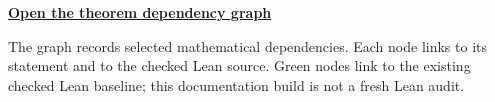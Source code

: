 \documentclass[11pt]{article}
\begin{document}
\maketitle
\noindent\href{dependency-graph.svg}{\textbf{Open the theorem dependency graph}}\par
The graph records selected mathematical dependencies. Each node links to its
statement and to the checked Lean source. Green nodes link to the existing checked Lean baseline; this documentation build is not a fresh Lean audit.
\tableofcontents

\end{document}
